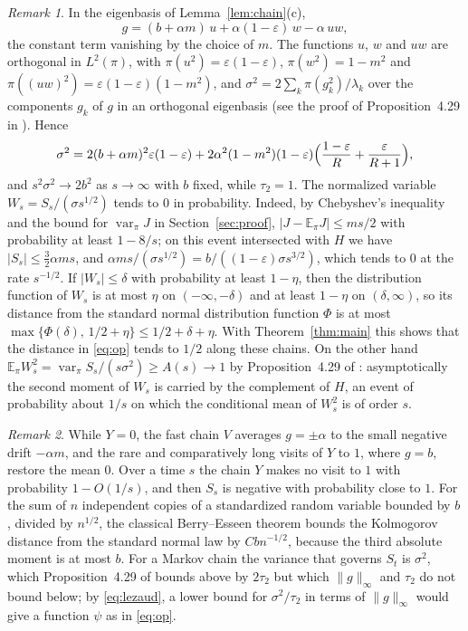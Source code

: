 \documentclass[11pt]{amsart}
\theoremstyle{remark}
\newtheorem{remark}{Remark}
\numberwithin{equation}{section}
\newcommand{\E}{\mathbb E}
\DeclareMathOperator{\var}{var}
\begin{document}
\begin{remark}\label{rem:sigma}
In the eigenbasis of Lemma~\ref{lem:chain}(c),
\[
g=(b+\alpha m)\,u+\alpha(1-\varepsilon)\,w-\alpha\,uw ,
\]
the constant term vanishing by the choice of $m$. The functions $u$, $w$ and $uw$ are orthogonal in $L^2(\pi)$, with $\pi(u^2)=\varepsilon(1-\varepsilon)$, $\pi(w^2)=1-m^2$ and $\pi((uw)^2)=\varepsilon(1-\varepsilon)(1-m^2)$, and $\sigma^2=2\sum_k\pi(g_k^2)/\lambda_k$ over the components $g_k$ of $g$ in an orthogonal eigenbasis (see the proof of Proposition~4.29 in \cite{AF}). Hence
\[
\sigma^2=2(b+\alpha m)^2\varepsilon(1-\varepsilon)+2\alpha^2(1-m^2)(1-\varepsilon)\Bigl(\frac{1-\varepsilon}R+\frac{\varepsilon}{R+1}\Bigr),
\]
and $s^2\sigma^2\to2b^2$ as $s\to\infty$ with $b$ fixed, while $\tau_2=1$. The normalized variable $W_s=S_s/(\sigma s^{1/2})$ tends to $0$ in probability. Indeed, by Chebyshev's inequality and the bound for $\var_\pi J$ in Section~\ref{sec:proof}, $|J-\E_\pi J|\le ms/2$ with probability at least $1-8/s$; on this event intersected with $H$ we have $|S_s|\le\frac32\alpha ms$, and $\alpha ms/(\sigma s^{1/2})=b/((1-\varepsilon)\sigma s^{3/2})$, which tends to $0$ at the rate $s^{-1/2}$. If $|W_s|\le\delta$ with probability at least $1-\eta$, then the distribution function of $W_s$ is at most $\eta$ on $(-\infty,-\delta)$ and at least $1-\eta$ on $(\delta,\infty)$, so its distance from the standard normal distribution function $\Phi$ is at most $\max\{\Phi(\delta),\,1/2+\eta\}\le1/2+\delta+\eta$. With Theorem~\ref{thm:main} this shows that the distance in \eqref{eq:op} tends to $1/2$ along these chains. On the other hand $\E_\pi W_s^2=\var_\pi S_s/(s\sigma^2)\ge A(s)\to1$ by Proposition~4.29 of \cite{AF}: asymptotically the second moment of $W_s$ is carried by the complement of $H$, an event of probability about $1/s$ on which the conditional mean of $W_s^2$ is of order $s$.
\end{remark}

\begin{remark}
While $Y=0$, the fast chain $V$ averages $g=\pm\alpha$ to the small negative drift $-\alpha m$, and the rare and comparatively long visits of $Y$ to $1$, where $g=b$, restore the mean $0$. Over a time $s$ the chain $Y$ makes no visit to $1$ with probability $1-O(1/s)$, and then $S_s$ is negative with probability close to $1$. For the sum of $n$ independent copies of a standardized random variable bounded by $b$, divided by $n^{1/2}$, the classical Berry--Esseen theorem bounds the Kolmogorov distance from the standard normal law by $Cbn^{-1/2}$, because the third absolute moment is at most $b$. For a Markov chain the variance that governs $S_t$ is $\sigma^2$, which Proposition~4.29 of \cite{AF} bounds above by $2\tau_2$ but which $\|g\|_\infty$ and $\tau_2$ do not bound below; by \eqref{eq:lezaud}, a lower bound for $\sigma^2/\tau_2$ in terms of $\|g\|_\infty$ would give a function $\psi$ as in \eqref{eq:op}.
\end{remark}
\end{document}
